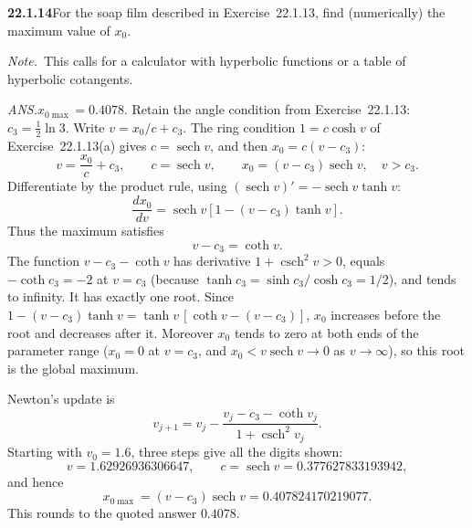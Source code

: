 \par\bigskip
\noindent\textbf{22.1.14}\quad For the soap film described in
Exercise~22.1.13, find (numerically) the maximum value of
$x_{0}$.
\par\emph{Note.}~This calls for a calculator with hyperbolic
functions or a table of hyperbolic cotangents.
\par\nobreak\hfill\emph{ANS.}\enspace$x_{0\max}=0.4078$.
\solution
Retain the angle condition from Exercise~22.1.13:
$c_3=\tfrac12\ln3$. Write $v=x_0/c+c_3$. The ring condition
$1=c\cosh v$ of Exercise~22.1.13(a) gives $c=\operatorname{sech}v$, and
then $x_0=c(v-c_3)$:
\[
v=\frac{x_0}{c}+c_3,\qquad
c=\operatorname{sech}v,\qquad
x_0=(v-c_3)\operatorname{sech}v,\quad v>c_3.
\]
Differentiate by the product rule, using
$(\operatorname{sech}v)'=-\operatorname{sech}v\tanh v$:
\[
\frac{dx_0}{dv}
=\operatorname{sech}v[1-(v-c_3)\tanh v].
\]
Thus the maximum satisfies
\[
\boxed{v-c_3=\coth v}.
\]
The function $v-c_3-\coth v$ has derivative
$1+\operatorname{csch}^2v>0$, equals $-\coth c_3=-2$ at $v=c_3$
(because $\tanh c_3=\sinh c_3/\cosh c_3=1/2$),
and tends to infinity. It has exactly one root. Since
$1-(v-c_3)\tanh v=\tanh v\,[\coth v-(v-c_3)]$, $x_0$ increases before
the root and decreases after it. Moreover $x_0$ tends to zero at both
ends of the parameter range ($x_0=0$ at $v=c_3$, and
$x_0<v\operatorname{sech}v\to0$ as $v\to\infty$), so this root is the
global maximum.

Newton's update is
\[
v_{j+1}=v_j-\frac{v_j-c_3-\coth v_j}
{1+\operatorname{csch}^2v_j}.
\]
Starting with $v_0=1.6$, three steps give all the digits shown:
\[
v=1.62926936306647,\qquad
c=\operatorname{sech}v=0.377627833193942,
\]
and hence
\[
\boxed{x_{0\max}=(v-c_3)\operatorname{sech}v
=0.407824170219077}.
\]
This rounds to the quoted answer $0.4078$.

